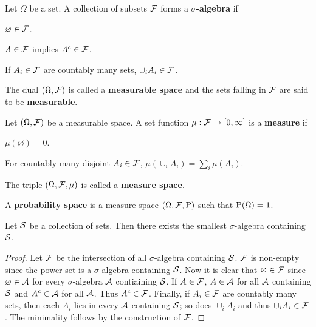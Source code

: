 \begin{definition}
    Let $\Omega$ be a set. A collection of subsets $\F$ forms 
    a \textbf{$\sigma$-algebra} if 
    \begin{thmenum}
        \item $\varnothing\in\F$. 
        \item $A\in\F$ implies $A^c\in\F$. 
        \item If $A_i\in\F$ are countably many sets, $\cup_iA_i\in\F$. 
    \end{thmenum}
    The dual $(\Omega, \F)$ is called a \textbf{measurable space} and 
    the sets falling in $\F$ are said to be \textbf{measurable}. 
\end{definition}

\begin{definition}
    Let $(\Omega, \F)$ be a measurable space. A set function $\mu:\F\to[0,\infty]$ 
    is a \textbf{measure} if 
    \begin{thmenum}
        \item $\mu(\varnothing) = 0$. 
        \item For countably many disjoint $A_i\in\F$, $\mu(\cup_i A_i) = \sum_i \mu(A_i)$. 
    \end{thmenum}
    The triple $(\Omega, \F, \mu)$ is called a \textbf{measure space}.
\end{definition}

\begin{definition}
    A \textbf{probability space} is a measure space $(\Omega, \F, \P)$ 
    such that $\P(\Omega) = 1$. 
\end{definition}

\begin{lemma}
    Let $\S$ be a collection of sets. Then there exists the smallest $\sigma$-algebra 
    containing $\S$. 
\end{lemma}
\begin{proof}
    Let $\F$ be the intersection of all $\sigma$-algebra containing $\S$. $\F$ 
    is non-empty since the power set is a $\sigma$-algebra containing $\S$. Now 
    it is clear that $\varnothing\in\F$ since $\varnothing\in\A$ for every $\sigma$-algebra 
    $\A$ contiaining $\S$. If $A\in\F$, $A\in\A$ for all $\A$ containing $\S$ and 
    $A^c\in\A$ for all $\A$. Thus $A^c\in\F$. Finally, if $A_i\in\F$ are 
    countably many sets, then each $A_i$ lies in every $\A$ containing $\S$; 
    so does $\cup_i A_i$ and thus $\cup_i A_i\in\F$. The minimality follows by 
    the construction of $\F$. 
\end{proof}

